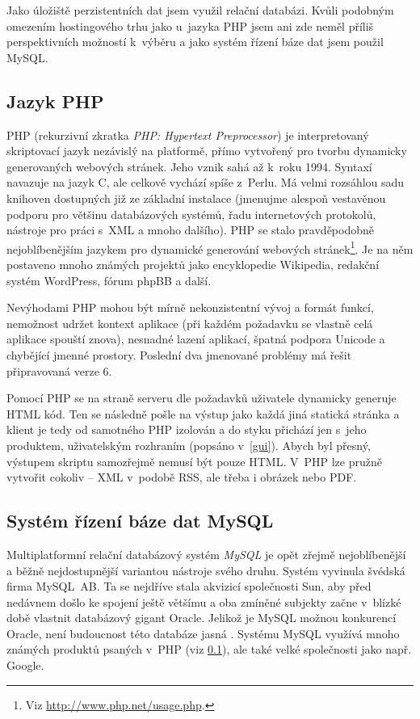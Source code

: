 Jako úložiště perzistentních dat jsem využil relační databázi. Kvůli
podobným omezením hostingového trhu jako u~jazyka PHP jsem ani zde
neměl příliš perspektivních možností k~výběru a jako systém
řízení báze dat jsem použil MySQL.

\subsection{Jazyk PHP}\label{php}
PHP (rekurzivní zkratka {\it PHP: Hypertext Preprocessor}) je
interpretovaný skriptovací jazyk nezávislý na platformě, přímo
vytvořený pro tvorbu dynamicky generovaných webových stránek. Jeho
vznik sahá až k~roku 1994. Syntaxí navazuje na jazyk C, ale celkově
vychází spíše z~Perlu. Má velmi rozsáhlou sadu knihoven dostupných
již ze základní instalace (jmenujme alespoň vestavěnou podporu pro
většinu databázových systémů, řadu internetových protokolů, nástroje
pro práci s~XML a mnoho dalšího). PHP se stalo pravděpodobně
nej\-oblíbenějším jazykem pro dynamické generování webových
stránek\footnote{Viz \url{http://www.php.net/usage.php}.}. Je na něm
postaveno mnoho známých projektů jako encyklopedie Wikipedia,
redakční systém WordPress, fórum phpBB a další. \cite{phpBook}

Nevýhodami PHP mohou být mírně nekonzistentní vývoj a formát funkcí,
nemožnost udržet kontext aplikace (při každém požadavku se vlastně
celá aplikace spouští znova), nesnadné lazení aplikací, špatná
podpora Unicode a chybějící jmenné prostory. Poslední dva jmenované
problémy má řešit připravovaná verze 6.

Pomocí PHP se na straně serveru dle požadavků
uživatele dynamicky generuje HTML kód. Ten se následně pošle na
výstup jako každá jiná statická stránka a klient je tedy od
samotného PHP izolován a do styku přichází jen s~jeho produktem,
uživatelským rozhraním (popsáno v~\ref{gui}). Abych byl přesný,
výstupem skriptu samozřejmě nemusí být pouze HTML. V~PHP lze
pružně vytvořit cokoliv -- XML v~podobě RSS, ale třeba i
obrázek nebo PDF.

\subsection{Systém řízení báze dat MySQL}\label{mysql}
Multiplatformní relační databázový systém {\it MySQL} je opět zřejmě
nej\-oblíbenější a běžně nej\-dostupnější variantou nástroje svého druhu. Systém
vyvinula švédská firma MySQL~AB. Ta se nej\-dříve stala
akvizicí společnosti Sun, aby před nedávnem došlo ke spojení ještě
většímu a oba zmíněné subjekty začne v~blízké době vlastnit databázový
gigant Oracle. Jelikož je MySQL možnou konkurencí Oracle, není budoucnost
této databáze jasná \cite{mysql}. Systému MySQL využívá mnoho známých produktů psaných v~PHP (viz
\ref{php}), ale také velké společnosti jako např. Google.

